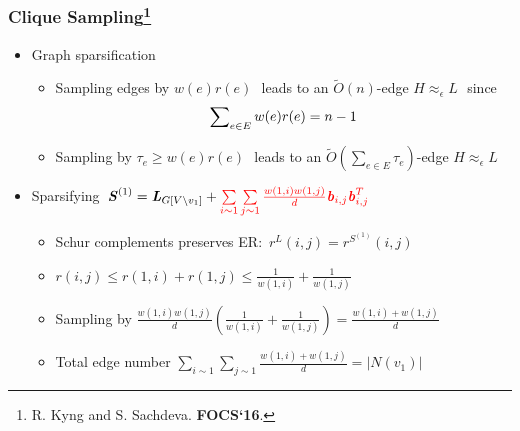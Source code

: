\documentclass[12pt]{beamer}
\def\sizeof#1{\left|#1  \right|}
\def\eps{\epsilon}
\newcommand\ttau{\boldsymbol{\mathit{\tau}}}
\newcommand\er{r}%
\newcommand\bb{\boldsymbol{\mathit{b}}}
\newcommand\LL{\boldsymbol{\mathit{L}}}
\newcommand\LH{\boldsymbol{\mathit{H}}}
\renewcommand\SS{\boldsymbol{\mathit{S}}}
\newcommand{\kh}[1]{\left(#1\right)}
\begin{document}
\begin{spacing}{1.3}
\frame
{
	\frametitle{Clique Sampling\footnote[frame]{\label{KS16}R. Kyng and S. Sachdeva. \textbf{FOCS`16}.}}
	\vspace{5pt}
	\begin{itemize}
		\small
		\item Graph sparsification
			\begin{itemize}
				\item \footnotesize Sampling edges by \scriptsize$w(e)\er(e)$\footnotesize\,\ leads to an
					\scriptsize$\widetilde{O}(n)$\footnotesize-edge \scriptsize$\LH \approx_\eps \LL$\footnotesize\,\ since
					\scriptsize\vspace{-8pt}
					\[
						\vspace{-8pt}
						\sum\nolimits_{e\in E} w(e)\er(e) = n - 1
					\]
					\footnotesize
				\item Sampling by \scriptsize$\ttau_e \geq w(e)\er(e)$\footnotesize\,\ leads to an
					\scriptsize$\widetilde{O}(\sum\nolimits_{e\in E}\ttau_e)$\footnotesize-edge \scriptsize$\LH \approx_\eps \LL$\footnotesize
			\end{itemize}
		\item Sparsifying \,\footnotesize$\SS^{(1)} = \LL_{G[V\setminus v_1]} + {\color{red} \sum\limits_{i\sim 1}\sum\limits_{j\sim 1} \frac{w(1,i)w(1,j)}{d}\bb_{i,j}\bb_{i,j}^T}$\small
		\begin{itemize}
			\item \footnotesize  Schur complements preserves ER: \,\scriptsize$\er^{\LL}(i,j) = \er^{\SS^{(1)}}(i,j)$\footnotesize
			\vspace{5pt}
			\item \scriptsize$\er(i,j) \leq \er(1,i) + \er(1,j)\leq \frac{1}{w(1,i)} + \frac{1}{w(1,j)}$\footnotesize
			\vspace{5pt}
			\item Sampling by \scriptsize$\frac{w(1,i)w(1,j)}{d} \kh{\frac{1}{w(1,i)} + \frac{1}{w(1,j)}} =
				\frac{w(1,i) + w(1,j)}{d}$\footnotesize
			\vspace{5pt}
			\item Total edge number \scriptsize$\sum\limits_{i\sim 1}\sum\limits_{j\sim 1} \frac{w(1,i) + w(1,j)}{d}
				= \sizeof{N(v_1)}$
		\end{itemize}
	\end{itemize}
}


\end{spacing}
\end{document}
